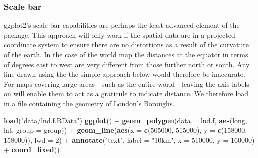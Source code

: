 \documentclass[]{article}
\newenvironment{Shaded}{}{}
\newcommand{\KeywordTok}[1]{\textcolor[rgb]{0.00,0.44,0.13}{\textbf{{#1}}}}
\newcommand{\DataTypeTok}[1]{\textcolor[rgb]{0.56,0.13,0.00}{{#1}}}
\newcommand{\DecValTok}[1]{\textcolor[rgb]{0.25,0.63,0.44}{{#1}}}
\newcommand{\StringTok}[1]{\textcolor[rgb]{0.25,0.44,0.63}{{#1}}}
\newcommand{\NormalTok}[1]{{#1}}
\begin{document}
\subsubsection{Scale bar}

ggplot2's scale bar capabilities are perhaps the least advanced element
of the package. This approach will only work if the spatial data are in
a projected coordinate system to ensure there are no distortions as a
result of the curvature of the earth. In the case of the world map the
distances at the equator in terms of degrees east to west are very
different from those further north or south. Any line drawn using the
the simple approach below would therefore be inaccurate. For maps
covering large areas - such as the entire world - leaving the axis
labels on will enable them to act as a graticule to indicate distance.
We therefore load in a file containing the geometry of London's
Boroughs.

\begin{Shaded}
\begin{Highlighting}[]
\KeywordTok{load}\NormalTok{(}\StringTok{"data/lnd.f.RData"}\NormalTok{)}
\KeywordTok{ggplot}\NormalTok{() + }\KeywordTok{geom_polygon}\NormalTok{(}\DataTypeTok{data =} \NormalTok{lnd.f, }\KeywordTok{aes}\NormalTok{(long, lat, }\DataTypeTok{group =} \NormalTok{group)) + }\KeywordTok{geom_line}\NormalTok{(}\KeywordTok{aes}\NormalTok{(}\DataTypeTok{x =} \KeywordTok{c}\NormalTok{(}\DecValTok{505000}\NormalTok{, }
    \DecValTok{515000}\NormalTok{), }\DataTypeTok{y =} \KeywordTok{c}\NormalTok{(}\DecValTok{158000}\NormalTok{, }\DecValTok{158000}\NormalTok{)), }\DataTypeTok{lwd =} \DecValTok{2}\NormalTok{) + }\KeywordTok{annotate}\NormalTok{(}\StringTok{"text"}\NormalTok{, }\DataTypeTok{label =} \StringTok{"10km"}\NormalTok{, }
    \DataTypeTok{x =} \DecValTok{510000}\NormalTok{, }\DataTypeTok{y =} \DecValTok{160000}\NormalTok{) + }\KeywordTok{coord_fixed}\NormalTok{()}
\end{Highlighting}
\end{Shaded}
\end{document}

